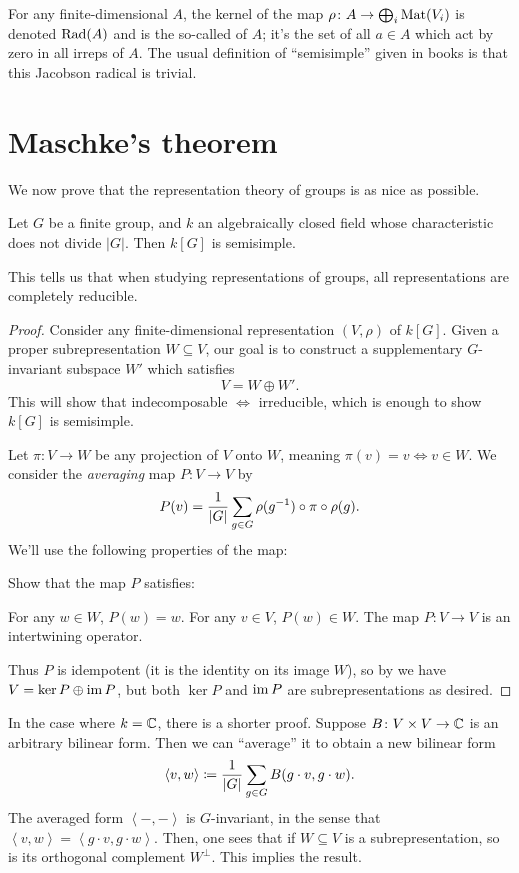\begin{remark}
	[Digression]
	For any finite-dimensional $A$, the kernel of the map
	$\rho \colon A \to \bigoplus_i \mathrm{Mat}(V_i)$ is denoted $\operatorname{Rad}(A)$
	and is the so-called  of $A$;
	it's the set of all $a \in A$ which act by zero in all irreps of $A$.
	The usual definition of ``semisimple'' given in books is that
	this Jacobson radical is trivial.
\end{remark}

\section{Maschke's theorem}
We now prove that the representation theory of groups is as nice as possible.
\begin{theorem}
	Let $G$ be a finite group, and $k$ an algebraically closed
	field whose characteristic does not divide $|G|$.
	Then $k[G]$ is semisimple.
\end{theorem}
This tells us that when studying representations of groups,
all representations are completely reducible.
\begin{proof}
	Consider any finite-dimensional representation $(V, \rho)$ of $k[G]$.
	Given a proper subrepresentation $W \subseteq V$,
	our goal is to construct a supplementary $G$-invariant subspace $W'$
	which satisfies \[ V = W \oplus W'. \]
	This will show that indecomposable $\iff$ irreducible,
	which is enough to show $k[G]$ is semisimple.

	Let $\pi \colon V \to W$ be any projection of $V$ onto $W$,
	meaning $\pi(v) = v \iff v \in W$.
	We consider the \emph{averaging} map $P \colon V \to V$ by
	\[
		P(v) = \frac{1}{\left\lvert G \right\rvert}
		\sum_{g \in G} \rho(g^{-1}) \circ \pi \circ \rho(g).
	\]
	We'll use the following properties of the map:
	\begin{exercise}
		Show that the map $P$ satisfies:
		\begin{itemize}
			\ii For any $w \in W$, $P(w) = w$.
			\ii For any $v \in V$, $P(w) \in W$.
			\ii The map $P \colon V \to V$ is an intertwining operator.
		\end{itemize}
	\end{exercise}
	Thus $P$ is idempotent (it is the identity on its image $W$),
	so by  we have $V = \ker P \oplus \operatorname{im} P$,
	but both $\ker P$ and $\operatorname{im} P$ are subrepresentations as desired.
\end{proof}
\begin{remark}
	In the case where $k = \mathbb C$, there is a shorter proof.
	Suppose $B \colon V \times V \to \mathbb C$ is an arbitrary bilinear form.
	Then we can ``average'' it to obtain a new bilinear form
	\[ \left< v,w \right> \coloneqq \frac{1}{|G|} \sum_{g \in G} B(g \cdot v, g \cdot w). \]
	The averaged form $\left< -,- \right>$ is $G$-invariant,
	in the sense that $\left< v,w \right> = \left< g \cdot v, g \cdot w\right>$.
	Then, one sees that if $W \subseteq V$ is a subrepresentation,
	so is its orthogonal complement $W^\perp$.
	This implies the result.
\end{remark}

